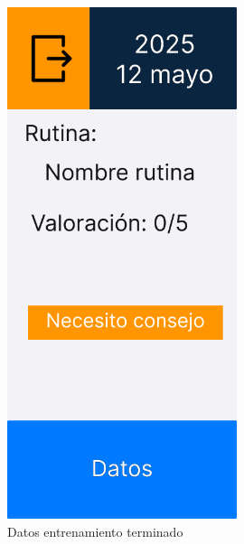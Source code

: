 \begin{figure}[H]
   \centering
    \includegraphics[width=0.6\textwidth]{fotos/Frame 31.png}
    \caption{Datos entrenamiento terminado}
    \label{fig:Datos entrenamiento terminado}
\end{figure}

